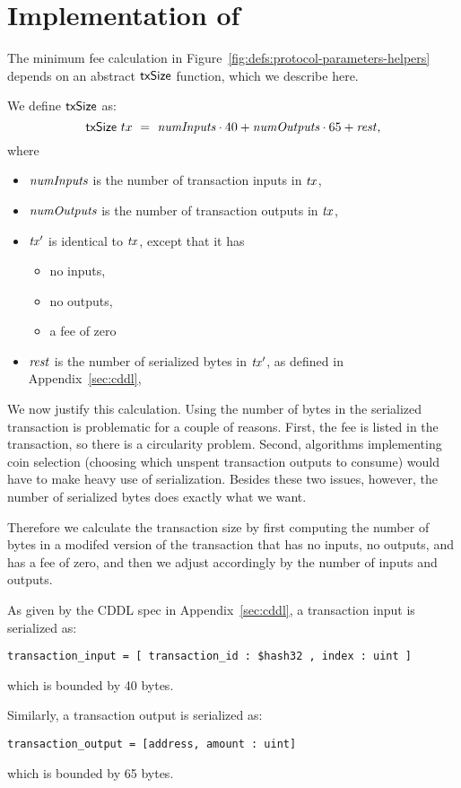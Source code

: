 \section{Implementation of }
\label{sec:txSize}

The minimum fee calculation in Figure~\ref{fig:defs:protocol-parameters-helpers}
depends on an abstract $\mathsf{txSize}$ function, which we describe here.

We define $\mathsf{txSize}$ as:
$$\mathsf{txSize}~tx~=~\mathit{numInputs} \cdot 40 + \mathit{numOutputs} \cdot 65 + \mathit{rest},$$
where
\begin{itemize}
  \item $\mathit{numInputs}$ is the number of transaction inputs in $\mathit{tx}$,
  \item $\mathit{numOutputs}$ is the number of transaction outputs in $\mathit{tx}$,
  \item $\mathit{tx'}$ is identical to $\mathit{tx}$, except that it has
    \begin{itemize}
      \item no inputs,
      \item no outputs,
      \item a fee of zero
    \end{itemize}
  \item $\mathit{rest}$ is the number of serialized bytes in $\mathit{tx'}$,
    as defined in Appendix~\ref{sec:cddl},
\end{itemize}


We now justify this calculation.
Using the number of bytes in the serialized transaction is problematic for a couple of reasons.
First, the fee is listed in the transaction, so there is a circularity problem.
Second, algorithms implementing coin selection
(choosing which unspent transaction outputs to consume)
would have to make heavy use of serialization.
Besides these two issues, however, the number of serialized bytes
does exactly what we want.

Therefore we calculate the transaction size by first computing
the number of bytes in a modifed version of the transaction
that has no inputs, no outputs, and has a fee of zero,
and then we adjust accordingly by the number of inputs and outputs.

As given by the CDDL spec in Appendix~\ref{sec:cddl},
a transaction input is serialized as:
\begin{lstlisting}[backgroundcolor = \color{lightgray}]
transaction_input = [ transaction_id : $hash32 , index : uint ]
\end{lstlisting}
which is bounded by 40 bytes.

Similarly, a transaction output is serialized as:
\begin{lstlisting}[backgroundcolor = \color{lightgray}]
transaction_output = [address, amount : uint]
\end{lstlisting}
which is bounded by 65 bytes.
